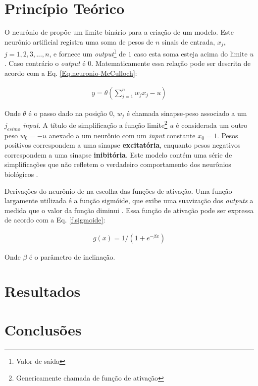 \documentclass[journal, a4paper]{IEEEtran}
\begin{document}
\section{Princípio Teórico}
O neurônio de \citet{McCulloch1943} propõe um limite binário para a criação de um modelo. Este neurônio artificial registra uma soma de pesos de $n$ sinais de entrada, $x_{j}$, $j=1,2,3,...,n$, e fornece um \textit{output}\footnote{Valor de saída} de $1$ caso esta soma esteja acima do limite $u$. Caso contrário o \textit{output} é $0$. Matematicamente essa relação pode ser descrita de acordo com a Eq. \ref{Eq.neuronio-McCulloch}:

\begin{eqnarray}
y=\theta \left( \sum^{n}_{j=1} w_{j} x_{j} -u \right)
\label{Eq.neuronio-McCulloch}
\end{eqnarray}

Onde $\theta$ é o passo dado na posição $0$, $w_{j}$ é chamada sinapse-peso associado a um $j_{esimo}$ \textit{input}. A título de simplificação a função limite\footnote{Genericamente chamada de função de ativação} $u$ é considerada um outro peso $w_{0}=-u$ anexado a um neurônio com um \textit{input} constante $x_{0}=1$. Pesos positivos correspondem a uma sinapse \textbf{excitatória}, enquanto pesos negativos correspondem a uma sinapse \textbf{inibitória}. Este modelo contém uma série de simplificações que não refletem o verdadeiro comportamento dos neurônios biológicos \citep{Mao1996}.  

Derivações do neurônio de \citet{McCulloch1943} na escolha das funções de ativação. Uma função largamente utilizada é a função sigmóide, que exibe uma suavização dos \textit{outputs} a medida que o valor da função diminui \citep{Mao1996,Misra2010}. Essa função de ativação pode ser expressa de acordo com a Eq. \ref{f.sigmoide}:

\begin{eqnarray}
g(x)=1/(1+e^{-\beta x})
\label{f.sigmoide}
\end{eqnarray}

Onde $\beta$ é o parâmetro de inclinação. %
\\




\section{Resultados}



\section{Conclusões}










\end{document}
